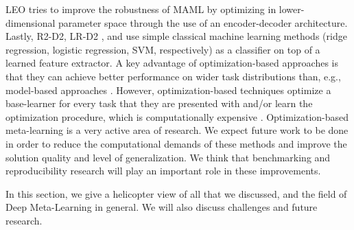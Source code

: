 LEO  tries to improve the robustness of MAML by optimizing in lower-dimensional parameter space through the use of an encoder-decoder architecture. 
Lastly, R2-D2, LR-D2 , and  use simple classical machine learning methods (ridge regression, logistic regression, SVM, respectively) as a classifier on top of a learned feature extractor.  
A key advantage of optimization-based approaches is that they can achieve better performance on wider task distributions than, e.g., model-based approaches . However, optimization-based techniques optimize a base-learner for every task that they are presented with and/or learn the optimization procedure, which is computationally expensive . 
Optimization-based meta-learning is a very active area of research. We expect future work to be done in order to reduce the computational demands of these methods and improve the solution quality and level of generalization. We think that benchmarking and reproducibility research will play an important role in these improvements.

\label{sec:conclusion}
In this section, we give a helicopter view of all that we discussed, and the field of Deep Meta-Learning in general. We will also discuss challenges and future research.

